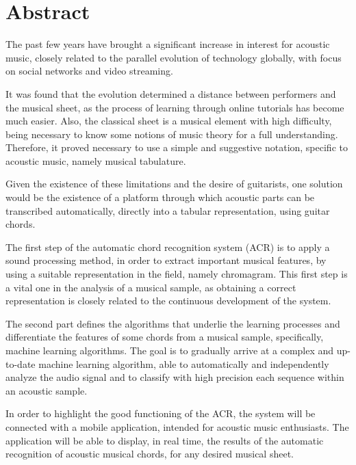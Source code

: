 \documentclass[a4paper,12pt]{report}
\begin{document}
\chapter*{Abstract}

The past few years have brought a significant increase in 
interest for acoustic music, 
closely related to the parallel evolution of technology globally, 
with focus on social networks and video streaming.

It was found that the evolution determined a distance between
performers and the musical sheet, as the process of learning through 
online tutorials has become much easier. 
Also, the classical sheet is a musical element with high difficulty, 
being necessary to know some notions of music theory for a full understanding.
Therefore, it proved necessary to use a simple and suggestive notation, 
specific to acoustic music, namely musical tabulature.

Given the existence of these limitations and the desire of guitarists, 
one solution would be the existence of a platform through which acoustic 
parts can be transcribed automatically, directly into a tabular representation,
using guitar chords. 

The first step of the automatic chord recognition system (ACR) is to 
apply a sound processing method, in order to extract important musical 
features, by using a suitable representation in the field, namely chromagram.
This first step is a vital one in the analysis of a musical sample, 
as obtaining a correct representation is closely related to 
the continuous development of the system. 

The second part defines the algorithms that 
underlie the learning processes and differentiate the 
features of some chords from a musical sample, specifically, 
machine learning algorithms. The goal is to gradually arrive at a complex 
and up-to-date machine learning algorithm, able to automatically and independently 
analyze the audio signal and to classify with high 
precision each sequence within an acoustic sample.

In order to highlight the good functioning of the ACR, 
the system will be connected with a mobile application, 
intended for acoustic music enthusiasts. The application will be able to display, 
in real time, the results of the automatic recognition of acoustic musical chords, 
for any desired musical sheet.
\end{document}
